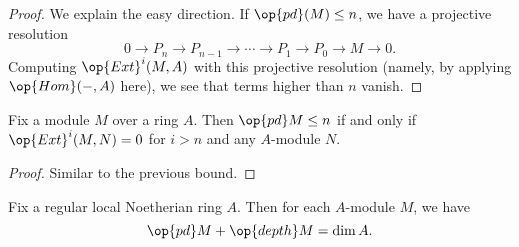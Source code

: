 \documentclass[../notes.tex]{subfiles}
\begin{document}
\begin{proof}
	We explain the easy direction. If $\op{pd}(M)\le n$, we have a projective resolution
	\[0\to P_n\to P_{n-1}\to\cdots\to P_1\to P_0\to M\to0.\]
	Computing $\op{Ext}^i(M,A)$ with this projective resolution (namely, by applying $\op{Hom}(-,A)$ here), we see that terms higher than $n$ vanish.
\end{proof}
\begin{proposition} \label{prop:ext-bounds-pd}
	Fix a module $M$ over a ring $A$. Then $\op{pd}M\le n$ if and only if $\op{Ext}^i(M,N)=0$ for $i>n$ and any $A$-module $N$.
\end{proposition}
\begin{proof}
	Similar to the previous bound.
\end{proof}
\begin{proposition} \label{prop:pd-depth-bound}
	Fix a regular local Noetherian ring $A$. Then for each $A$-module $M$, we have
	\[\op{pd}M+\op{depth}M=\dim A.\]
\end{proposition}
\end{document}
